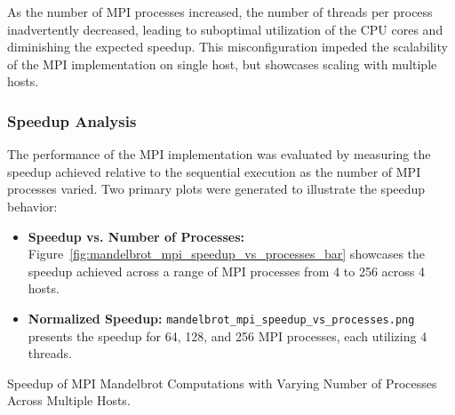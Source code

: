 \documentclass[
	report, %
	11pt, %
]{CSUniSchoolLabReport}
\newcounter{ct}
\begin{document}
As the number of MPI processes increased, the number of threads per process inadvertently decreased, leading to suboptimal utilization of the CPU cores and diminishing the expected speedup. This misconfiguration impeded the scalability of the MPI implementation on single host, but showcases scaling with multiple hosts.

\subsubsection{Speedup Analysis}

The performance of the MPI implementation was evaluated by measuring the speedup achieved relative to the sequential execution as the number of MPI processes varied. Two primary plots were generated to illustrate the speedup behavior:

\begin{itemize}
	\item \textbf{Speedup vs. Number of Processes:} Figure~\ref{fig:mandelbrot_mpi_speedup_vs_processes_bar} showcases the speedup achieved across a range of MPI processes from 4 to 256 across 4 hosts.
	\item \textbf{Normalized Speedup:} \texttt{mandelbrot\_mpi\_speedup\_vs\_processes.png} presents the speedup for 64, 128, and 256 MPI processes, each utilizing 4 threads.
\end{itemize}

\begin{table}[H]
	\centering
	\captionsetup{justification=centering, width=.8\linewidth}
	

	\caption{Speedup of MPI Mandelbrot Computations with Varying Number of Processes Across Multiple Hosts.}
	\label{tab:mandelbrot_mpi_speedup_vs_processes}
\end{table}
\end{document}

